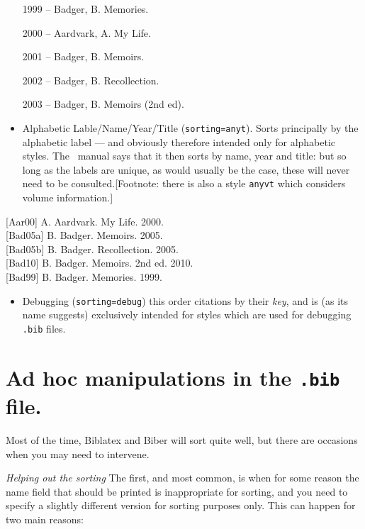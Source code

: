 \begin{itemize}
\item[1999]
  -- Badger, B. Memories.
\item[2000]
  -- Aardvark, A. My Life.
\item[2001]
  -- Badger, B. Memoirs.
\item[2002]
  -- Badger, B. Recollection.
\item[2003]
  -- Badger, B. Memoirs (2nd ed).
\end{itemize}

\begin{itemize}
\item
  Alphabetic Lable/Name/Year/Title (\texttt{sorting=anyt}). Sorts
  principally by the alphabetic label --- and obviously therefore
  intended only for alphabetic styles. The \biblatex~manual says that it
  then sorts by name, year and title: but so long as the labels are
  unique, as would usually be the case, these will never need to be
  consulted.{[}Footnote: there is also a style \texttt{anyvt} which
  considers volume information.{]}
\end{itemize}

{[}Aar00{]} A. Aardvark. My Life. 2000. \\
{[}Bad05a{]} B. Badger. Memoirs.
2005.\\
{[}Bad05b{]} B. Badger. Recollection. 2005. \\{[}Bad10{]} B. Badger.
Memoirs. 2nd ed. 2010. \\{[}Bad99{]} B. Badger. Memories. 1999.

\begin{itemize}
\item
  Debugging (\texttt{sorting=debug}) this order citations by their
  \emph{key}, and is (as its name suggests) exclusively intended for
  styles which are used for debugging \texttt{.bib} files.
\end{itemize}

\section{Ad hoc manipulations in the \texttt{.bib} file.}

Most of the time, Biblatex and Biber will sort quite well, but there are
occasions when you may need to intervene.

\emph{Helping out the sorting} The first, and most common, is when for
some reason the name field that should be printed is inappropriate for
sorting, and you need to specify a slightly different version for
sorting purposes only. This can happen for two main reasons:

